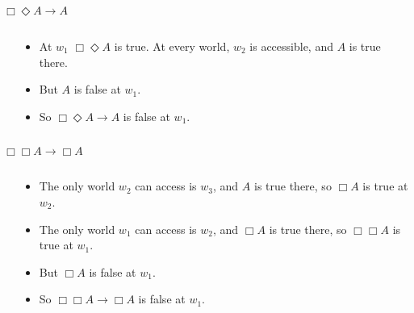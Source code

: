 \documentclass[
  14pt,
  letterpaper,
  ignorenonframetext,
  aspectratio=169,
  handout]{beamer}
\begin{document}
\begin{frame}{\(\Box \Diamond A \rightarrow A\)}
\protect\hypertarget{box-diamond-a-rightarrow-a}{}
\begin{columns}
    \begin{column}{0.45\textwidth}
    \end{column}
    \begin{column}{0.5\textwidth}
    \begin{itemize}
    \item At $w_1$ $\Box \Diamond A$ is true. At every world, $w_2$ is accessible, and $A$ is true there.
    \item But $A$ is false at $w_1$.
    \item So $\Box \Diamond A \rightarrow A$ is false at $w_1$.
    \end{itemize}
  \end{column}
\end{columns}
\end{frame}

\begin{frame}{\(\Box \Box A \rightarrow \Box A\)}
\protect\hypertarget{box-box-a-rightarrow-box-a}{}
\begin{columns}
    \begin{column}{0.45\textwidth}
    \end{column}
    \begin{column}{0.5\textwidth}
    \begin{itemize}
    \item The only world $w_2$ can access is $w_3$, and $A$ is true there, so $\Box A$ is true at $w_2$.
    \item The only world $w_1$ can access is $w_2$, and $\Box A$ is true there, so $\Box \Box A$ is true at $w_1$.
    \item But $\Box A$ is false at $w_1$.
    \item So $\Box \Box A \rightarrow \Box A$ is false at $w_1$.
    \end{itemize}
  \end{column}
\end{columns}
\end{frame}
\end{document}
